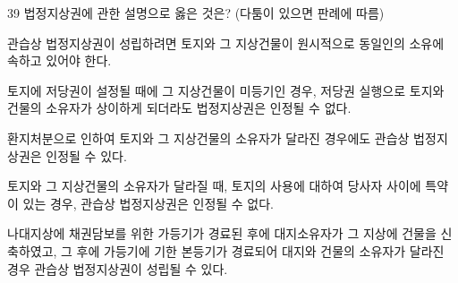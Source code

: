 \begin{question}{39}
법정지상권에 관한 설명으로 옳은 것은? (다툼이 있으면 판례에 따름)
\begin{choices}
  \item 관습상 법정지상권이 성립하려면 토지와 그 지상건물이 원시적으로 동일인의 소유에 속하고 있어야 한다.
  \item 토지에 저당권이 설정될 때에 그 지상건물이 미등기인 경우, 저당권 실행으로 토지와 건물의 소유자가 상이하게 되더라도 법정지상권은 인정될 수 없다.
  \item 환지처분으로 인하여 토지와 그 지상건물의 소유자가 달라진 경우에도 관습상 법정지상권은 인정될 수 있다.
  \item 토지와 그 지상건물의 소유자가 달라질 때, 토지의 사용에 대하여 당사자 사이에 특약이 있는 경우, 관습상 법정지상권은 인정될 수 없다.
  \item 나대지상에 채권담보를 위한 가등기가 경료된 후에 대지소유자가 그 지상에 건물을 신축하였고, 그 후에 가등기에 기한 본등기가 경료되어 대지와 건물의 소유자가 달라진 경우 관습상 법정지상권이 성립될 수 있다.
\end{choices}
\end{question}
